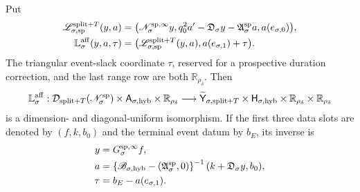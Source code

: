 \begin{theorem}
Put
\begin{align}
 \mathscr L_{\sigma,\rm sp}^{\mathrm{split}+T}(y,a)
 =\bigl(&\mathscr N_\sigma^{\rm sp,\infty}y,
 q_0^2a'-\mathfrak D_\sigma y
              -\mathfrak A_\sigma^{\rm sp}a,
 a(e_{\sigma,0})\bigr),                          \label{eq:speed-bordered-phase-normal-operator}\\
 \mathbb L_{\sigma}^{\rm aff}(y,a,\tau)
 =\bigl(&\mathscr L_{\sigma,\rm sp}^{\mathrm{split}+T}(y,a),
          a(e_{\sigma,1})+\tau\bigr).            \label{eq:affine-complete-bordered-operator}
\end{align}
The triangular event-slack coordinate \(\tau\), reserved for a prospective
duration correction, and the last range row are both
\(\mathbb R_{\rho_\delta}\).  Then
\begin{equation}
 \mathbb L_{\sigma}^{\rm aff}:
 \mathcal D_{\mathrm{split}+T}
       (\mathscr N_\sigma^{\rm sp})
 \times\mathsf A_{\sigma,\mathrm{hyb}}
 \times\mathbb R_{\rho_\delta}
 \longrightarrow
 \widetilde{\mathsf Y}_{\sigma,\mathrm{split}+T}
 \times\mathsf H_{\sigma,\mathrm{hyb}}
 \times\mathbb R_{\rho_\delta}\times\mathbb R_{\rho_\delta}
                                                        \label{eq:affine-complete-bordered-isomorphism}
\end{equation}
is a dimension- and diagonal-uniform isomorphism.  If the first three data
slots are denoted by \((f,k,b_0)\) and the terminal event datum by \(b_E\),
its inverse is
\begin{align}
 y&=G_\sigma^{\rm sp,\infty}f,\notag\\
 a&=\left\{\mathscr B_{\sigma,\mathrm{hyb}}
       -(\mathfrak A_\sigma^{\rm sp},0)\right\}^{-1}
       (k+\mathfrak D_\sigma y,b_0),\notag\\
 \tau&=b_E-a(e_{\sigma,1}).                     \label{eq:affine-complete-bordered-inverse}
\end{align}


\end{theorem}

